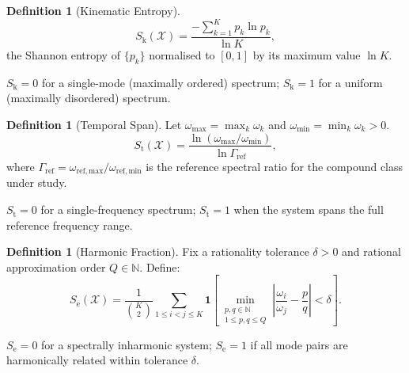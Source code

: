 \documentclass[11pt,twocolumn,a4paper]{article}
\theoremstyle{definition}
\newtheorem{definition}[theorem]{Definition}
\theoremstyle{remark}
\newcommand{\N}{\mathbb{N}}
\newcommand{\Sk}{S_{\mathrm{k}}}
\newcommand{\St}{S_{\mathrm{t}}}
\newcommand{\Se}{S_{\mathrm{e}}}
\begin{document}
\begin{definition}[Kinematic Entropy]
\label{def:sk}
\begin{equation}
\Sk(\mathcal{X}) = \frac{-\displaystyle\sum_{k=1}^K p_k \ln p_k}{\ln K},
\label{eq:sk}
\end{equation}
the Shannon entropy \citep{shannon1948} of $\{p_k\}$ normalised to $[0,1]$
by its maximum value $\ln K$.
\end{definition}

$\Sk = 0$ for a single-mode (maximally ordered) spectrum;
$\Sk = 1$ for a uniform (maximally disordered) spectrum.

\begin{definition}[Temporal Span]
\label{def:st}
Let $\omega_{\max} = \max_k \omega_k$ and $\omega_{\min} = \min_k \omega_k > 0$.
\begin{equation}
\St(\mathcal{X}) = \frac{\ln(\omega_{\max} / \omega_{\min})}{\ln \Gamma_{\mathrm{ref}}},
\label{eq:st}
\end{equation}
where $\Gamma_{\mathrm{ref}} = \omega_{\mathrm{ref,max}} / \omega_{\mathrm{ref,min}}$
is the reference spectral ratio for the compound class under study.
\end{definition}

$\St = 0$ for a single-frequency spectrum; $\St = 1$ when the system spans
the full reference frequency range.

\begin{definition}[Harmonic Fraction]
\label{def:se}
Fix a rationality tolerance $\delta > 0$ and rational approximation order
$Q \in \N$. Define:
\begin{equation}
\Se(\mathcal{X}) = \frac{1}{\binom{K}{2}} \sum_{1 \leq i < j \leq K}
\mathbf{1}\!\left[\min_{\substack{p,q \in \N \\ 1 \leq p,q \leq Q}}
\left|\frac{\omega_i}{\omega_j} - \frac{p}{q}\right| < \delta\right].
\label{eq:se}
\end{equation}
\end{definition}

$\Se = 0$ for a spectrally inharmonic system; $\Se = 1$ if all mode pairs
are harmonically related within tolerance $\delta$.
\end{document}
